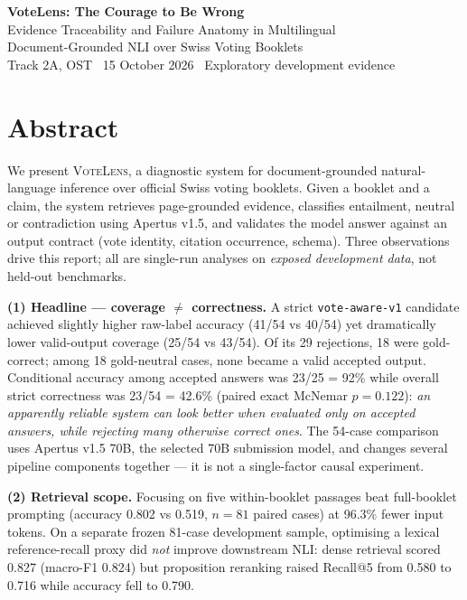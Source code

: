 \documentclass[10pt,a4paper]{article}
\newcommand{\votelens}{\textsc{VoteLens}}
\begin{document}
\begin{center}
{\LARGE\bfseries VoteLens: The Courage to Be Wrong}\\[6pt]
{\large Evidence Traceability and Failure Anatomy in Multilingual\\
Document-Grounded NLI over Swiss Voting Booklets}\\[10pt]
{\small Track 2A, OST \textbullet\ 15 October 2026 \textbullet\ Exploratory development evidence}
\end{center}

\section*{Abstract}

We present \votelens{}, a diagnostic system for document-grounded natural-language inference over official Swiss voting booklets. Given a booklet and a claim, the system retrieves page-grounded evidence, classifies entailment, neutral or contradiction using Apertus v1.5, and validates the model answer against an output contract (vote identity, citation occurrence, schema). Three observations drive this report; all are single-run analyses on \emph{exposed development data}, not held-out benchmarks.

\textbf{(1) Headline --- coverage $\neq$ correctness.} A strict \texttt{vote-aware-v1} candidate achieved slightly higher raw-label accuracy (41/54 vs 40/54) yet dramatically lower valid-output coverage (25/54 vs 43/54). Of its 29 rejections, 18 were gold-correct; among 18 gold-neutral cases, none became a valid accepted output. Conditional accuracy among accepted answers was 23/25 = 92\% while overall strict correctness was 23/54 = 42.6\% (paired exact McNemar $p = 0.122$): \emph{an apparently reliable system can look better when evaluated only on accepted answers, while rejecting many otherwise correct ones}. The 54-case comparison uses Apertus v1.5 70B, the selected 70B submission model, and changes several pipeline components together --- it is not a single-factor causal experiment.

\textbf{(2) Retrieval scope.} Focusing on five within-booklet passages beat full-booklet prompting (accuracy 0.802 vs 0.519, $n = 81$ paired cases) at 96.3\% fewer input tokens. On a separate frozen 81-case development sample, optimising a lexical reference-recall proxy did \emph{not} improve downstream NLI: dense retrieval scored 0.827 (macro-F1 0.824) but proposition reranking raised Recall@5 from 0.580 to 0.716 while accuracy fell to 0.790.
\end{document}
